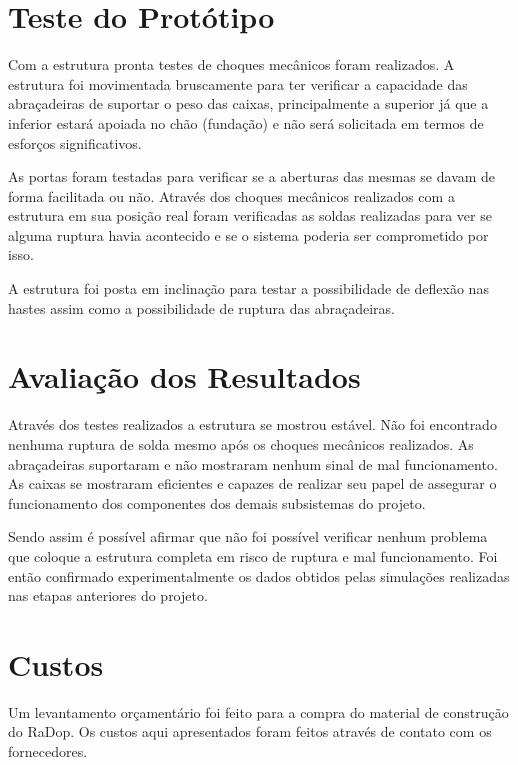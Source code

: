 \section{Teste do Protótipo}

Com a estrutura pronta testes de choques mecânicos foram realizados. A estrutura foi movimentada bruscamente para ter verificar a capacidade das abraçadeiras de suportar o peso das caixas, principalmente a superior já que a inferior estará apoiada no chão (fundação) e não será solicitada em termos de esforços significativos.

As portas foram testadas para verificar se a aberturas das mesmas se davam de forma facilitada ou não. Através dos choques mecânicos realizados com a estrutura em sua posição real foram verificadas as soldas realizadas para ver se alguma ruptura havia acontecido e se o sistema poderia ser comprometido por isso.

A estrutura foi posta em inclinação para testar a possibilidade de deflexão nas hastes assim como a possibilidade de ruptura das abraçadeiras.

\section{Avaliação dos Resultados}

Através dos testes realizados a estrutura se mostrou estável. Não foi encontrado nenhuma ruptura de solda mesmo após os choques mecânicos realizados. As abraçadeiras suportaram e não mostraram nenhum sinal de mal funcionamento. As caixas se mostraram eficientes e capazes de realizar seu papel de assegurar o funcionamento dos componentes dos demais subsistemas do projeto.

Sendo assim é possível afirmar que não foi possível verificar nenhum problema que coloque a estrutura completa em risco de ruptura e mal funcionamento. Foi então confirmado experimentalmente os dados obtidos pelas simulações realizadas nas etapas anteriores do projeto.

\section{Custos}

Um levantamento orçamentário foi feito para a compra do material de construção do RaDop. Os custos aqui apresentados foram feitos através de contato com os fornecedores. 


